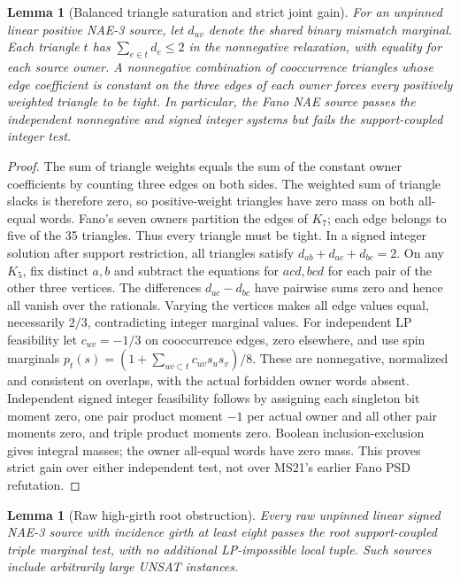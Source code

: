 \documentclass[11pt]{article}
\newtheorem{lemma}[theorem]{Lemma}
\begin{document}
\begin{lemma}[Balanced triangle saturation and strict joint gain]\label{lem:ms27-fano}
For an unpinned linear positive NAE-3 source, let $d_{uv}$ denote the shared binary mismatch marginal. Each triangle $t$ has $\sum_{e\in t}d_e\le2$ in the nonnegative relaxation, with equality for each source owner. A nonnegative combination of cooccurrence triangles whose edge coefficient is constant on the three edges of each owner forces every positively weighted triangle to be tight. In particular, the Fano NAE source passes the independent nonnegative and signed integer systems but fails the support-coupled integer test.
\end{lemma}
\begin{proof}
The sum of triangle weights equals the sum of the constant owner coefficients by counting three edges on both sides. The weighted sum of triangle slacks is therefore zero, so positive-weight triangles have zero mass on both all-equal words. Fano's seven owners partition the edges of $K_7$; each edge belongs to five of the 35 triangles. Thus every triangle must be tight. In a signed integer solution after support restriction, all triangles satisfy $d_{ab}+d_{ac}+d_{bc}=2$. On any $K_5$, fix distinct $a,b$ and subtract the equations for $acd,bcd$ for each pair of the other three vertices. The differences $d_{ac}-d_{bc}$ have pairwise sums zero and hence all vanish over the rationals. Varying the vertices makes all edge values equal, necessarily $2/3$, contradicting integer marginal values.
For independent LP feasibility let $c_{uv}=-1/3$ on cooccurrence edges, zero elsewhere, and use spin marginals $p_t(s)=(1+\sum_{uv\subset t}c_{uv}s_us_v)/8$. These are nonnegative, normalized and consistent on overlaps, with the actual forbidden owner words absent. Independent signed integer feasibility follows by assigning each singleton bit moment zero, one pair product moment $-1$ per actual owner and all other pair moments zero, and triple product moments zero. Boolean inclusion-exclusion gives integral masses; the owner all-equal words have zero mass. This proves strict gain over either independent test, not over MS21's earlier Fano PSD refutation.
\end{proof}
\begin{lemma}[Raw high-girth root obstruction]\label{lem:ms27-barrier}
Every raw unpinned linear signed NAE-3 source with incidence girth at least eight passes the root support-coupled triple marginal test, with no additional LP-impossible local tuple. Such sources include arbitrarily large UNSAT instances.
\end{lemma}
\end{document}
